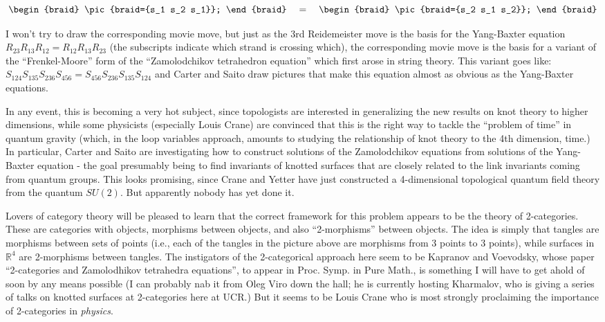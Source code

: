 \documentclass{article}
\begin{document}
\[
  \begin{braid}
    \pic{braid={s_1 s_2 s_1}};
  \end{braid}
  \quad=\quad
  \begin{braid}
    \pic{braid={s_2 s_1 s_2}};
  \end{braid}
\]

I won't try to draw the corresponding movie move, but just as the 3rd
Reidemeister move is the basis for the Yang-Baxter equation
\(R_{23}R_{13}R_{12} = R_{12}R_{13}R_{23}\) (the subscripts indicate
which strand is crossing which), the corresponding movie move is the
basis for a variant of the ``Frenkel-Moore'' form of the ``Zamolodchikov
tetrahedron equation'' which first arose in string theory. This variant
goes like:
\(S_{124}S_{135}S_{236}S_{456} = S_{456}S_{236}S_{135}S_{124}\) and
Carter and Saito draw pictures that make this equation almost as obvious
as the Yang-Baxter equations.

In any event, this is becoming a very hot subject, since topologists are
interested in generalizing the new results on knot theory to higher
dimensions, while some physicists (especially Louis Crane) are convinced
that this is the right way to tackle the ``problem of time'' in quantum
gravity (which, in the loop variables approach, amounts to studying the
relationship of knot theory to the 4th dimension, time.) In particular,
Carter and Saito are investigating how to construct solutions of the
Zamolodchikov equations from solutions of the Yang-Baxter equation - the
goal presumably being to find invariants of knotted surfaces that are
closely related to the link invariants coming from quantum groups. This
looks promising, since Crane and Yetter have just constructed a
4-dimensional topological quantum field theory from the quantum
\(SU(2)\). But apparently nobody has yet done it.

Lovers of category theory will be pleased to learn that the correct
framework for this problem appears to be the theory of 2-categories.
These are categories with objects, morphisms between objects, and also
``2-morphisms'' between objects. The idea is simply that tangles are
morphisms between sets of points (i.e., each of the tangles in the
picture above are morphisms from 3 points to 3 points), while surfaces
in \(\mathbb{R}^4\) are 2-morphisms between tangles. The instigators of
the 2-categorical approach here seem to be Kapranov and Voevodsky, whose
paper ``2-categories and Zamolodhikov tetrahedra equations'', to appear
in Proc. Symp. in Pure Math., is something I will have to get ahold of
soon by any means possible (I can probably nab it from Oleg Viro down
the hall; he is currently hosting Kharmalov, who is giving a series of
talks on knotted surfaces at 2-categories here at UCR.) But it seems to
be Louis Crane who is most strongly proclaiming the importance of
2-categories in \emph{physics}.
\end{document}

